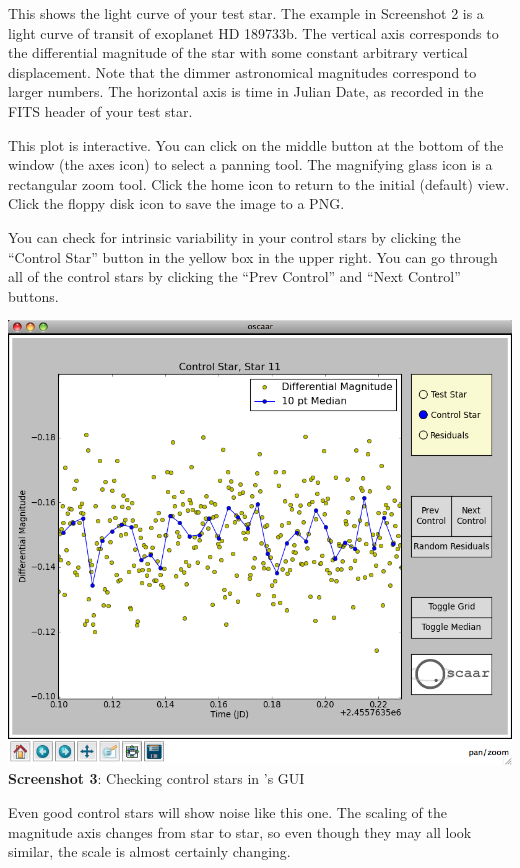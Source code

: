 \documentclass{article}
\begin{document}
This shows the light curve of your test star. The example in Screenshot 2 is a light curve of transit of exoplanet HD 189733b. The vertical axis corresponds to the differential magnitude of the star with some constant arbitrary vertical displacement. Note that the dimmer astronomical magnitudes correspond to larger numbers. The horizontal axis is time in Julian Date, as recorded in the FITS header of your test star. 

This plot is interactive. You can click on the middle button at the bottom of the window (the axes icon) to select a panning tool. The magnifying glass icon is a rectangular zoom tool. Click the home icon to return to the initial (default) view. Click the floppy disk icon to save the image to a PNG. 

You can check for intrinsic variability in your control stars by clicking the ``Control Star'' button in the yellow box in the upper right. You can go through all of the control stars by clicking the ``Prev Control'' and ``Next Control'' buttons.  \\

\begin{center}
\includegraphics[scale=0.4]{imgs/gui2.png}
{\small \textbf{Screenshot 3}: Checking control stars in \oscaar 's GUI }
\end{center}
\bigskip

Even good control stars will show noise like this one. The scaling of the magnitude axis changes from star to star, so even though they may all look similar, the scale is almost certainly changing. 
\end{document}

